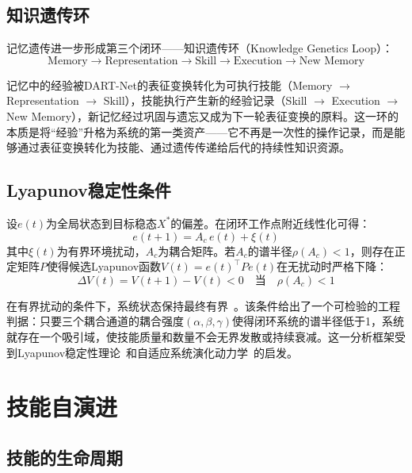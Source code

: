 \documentclass[12pt,a4paper]{ctexart}
\begin{document}
\subsection{知识遗传环}

记忆遗传进一步形成第三个闭环——知识遗传环（Knowledge Genetics Loop）：
\begin{equation}
\text{Memory} \to \text{Representation} \to \text{Skill} \to \text{Execution} \to \text{New Memory}
\label{eq:kg_loop}
\end{equation}

记忆中的经验被DART-Net的表征变换转化为可执行技能（Memory $\to$ Representation $\to$ Skill），技能执行产生新的经验记录（Skill $\to$ Execution $\to$ New Memory），新记忆经过巩固与遗忘又成为下一轮表征变换的原料。这一环的本质是将“经验”升格为系统的第一类资产——它不再是一次性的操作记录，而是能够通过表征变换转化为技能、通过遗传传递给后代的持续性知识资源。

\subsection{Lyapunov稳定性条件}

设$e(t)$为全局状态到目标稳态$X^*$的偏差。在闭环工作点附近线性化可得：
\begin{equation}
e(t+1) = A_c \, e(t) + \xi(t)
\label{eq:linearized}
\end{equation}
其中$\xi(t)$为有界环境扰动，$A_c$为耦合矩阵。若$A_c$的谱半径$\rho(A_c) < 1$，则存在正定矩阵$P$使得候选Lyapunov函数$V(t) = e(t)^{\top} P e(t)$在无扰动时严格下降：
\begin{equation}
\Delta V(t) = V(t+1) - V(t) < 0 \quad \text{当} \quad \rho(A_c) < 1
\label{eq:lyapunov}
\end{equation}

在有界扰动的条件下，系统状态保持最终有界~\cite{lyapunov1892stability,holland1975adaptation,bonabeau1999swarm}。该条件给出了一个可检验的工程判据：只要三个耦合通道的耦合强度$(\alpha, \beta, \gamma)$使得闭环系统的谱半径低于1，系统就存在一个吸引域，使技能质量和数量不会无界发散或持续衰减。这一分析框架受到Lyapunov稳定性理论~\cite{lyapunov1892stability}和自适应系统演化动力学~\cite{holland1975adaptation,boyd1985culture}的启发。

\section{技能自演进}

\subsection{技能的生命周期}
\end{document}
